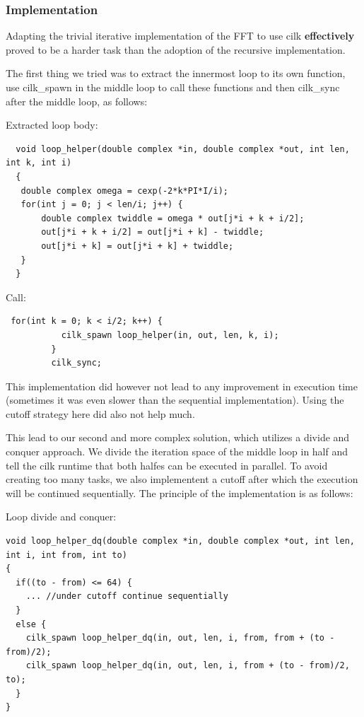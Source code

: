 \subsubsection{Implementation}
Adapting the trivial iterative implementation of the FFT to use cilk \textbf{effectively} proved to be a harder task than the adoption of the recursive implementation. 

The first thing we tried was to extract the innermost loop to its own function, use cilk\_spawn in the middle loop to call these functions and then cilk\_sync after the middle loop, as follows: 

Extracted loop body:
\begin{lstlisting}
  void loop_helper(double complex *in, double complex *out, int len, int k, int i)
  {
   double complex omega = cexp(-2*k*PI*I/i);
   for(int j = 0; j < len/i; j++) {
       double complex twiddle = omega * out[j*i + k + i/2];
       out[j*i + k + i/2] = out[j*i + k] - twiddle;
       out[j*i + k] = out[j*i + k] + twiddle;
   }
  }
\end{lstlisting}

Call: 
\begin{lstlisting}
 for(int k = 0; k < i/2; k++) {  
           cilk_spawn loop_helper(in, out, len, k, i);
         }
         cilk_sync;
\end{lstlisting}

This implementation did however not lead to any improvement in execution time (sometimes it was even slower than the sequential implementation). Using the cutoff strategy here did also not help much. 

This lead to our second and more complex solution, which utilizes a divide and conquer approach. We divide the iteration space of the middle loop in half and tell the cilk runtime that both halfes can be executed in parallel. To avoid creating too many tasks, we also implementent a cutoff after which the execution will be continued sequentially. The principle of the implementation is as follows: 

Loop divide and conquer: 
\begin{lstlisting}
void loop_helper_dq(double complex *in, double complex *out, int len, int i, int from, int to)
{
  if((to - from) <= 64) {
    ... //under cutoff continue sequentially
  }
  else {
    cilk_spawn loop_helper_dq(in, out, len, i, from, from + (to - from)/2);
    cilk_spawn loop_helper_dq(in, out, len, i, from + (to - from)/2, to);
  }
}
\end{lstlisting}

